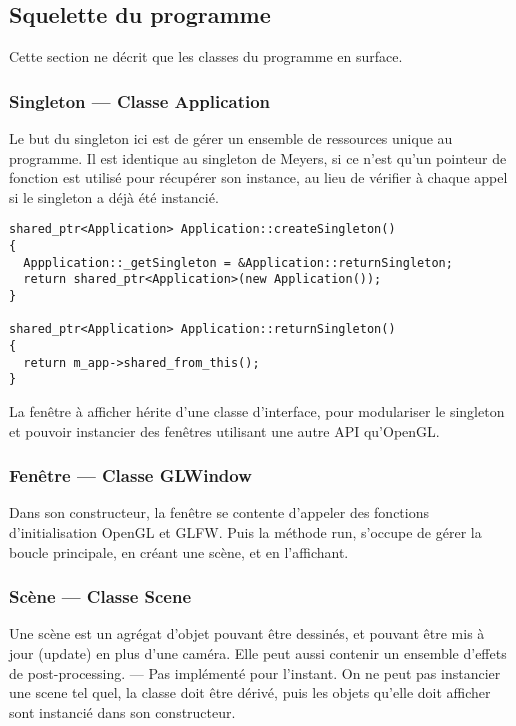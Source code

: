\documentclass[11pt, a4paper, titlepage]{article}
\begin{document}
\subsection{Squelette du programme}

Cette section ne décrit que les classes du programme en surface.

\subsubsection{Singleton --- Classe Application}

Le but du singleton ici est de gérer un ensemble de ressources unique au programme.
Il est identique au singleton de Meyers, si ce n'est qu'un pointeur de fonction est utilisé pour récupérer son instance, au lieu de vérifier à chaque appel
si le singleton a déjà été instancié.

\lstset{language=C++}

\begin{lstlisting}
shared_ptr<Application> Application::createSingleton()
{
  Appplication::_getSingleton = &Application::returnSingleton;
  return shared_ptr<Application>(new Application());
}

shared_ptr<Application> Application::returnSingleton()
{
  return m_app->shared_from_this();
}
\end{lstlisting}

La fenêtre à afficher hérite d'une classe d'interface, pour modulariser le singleton et pouvoir instancier des fenêtres utilisant une autre API qu'OpenGL.

\subsubsection{Fenêtre --- Classe GLWindow}

Dans son constructeur, la fenêtre se contente d'appeler des fonctions d'initialisation OpenGL et GLFW. Puis la méthode run, s'occupe de gérer la boucle
principale, en créant une scène, et en l'affichant.

\subsubsection{Scène --- Classe Scene}

Une scène est un agrégat d'objet pouvant être dessinés, et pouvant être mis à jour (update) en plus d'une caméra.
Elle peut aussi contenir un ensemble d'effets de post-processing. --- Pas implémenté pour l'instant. 
On ne peut pas instancier une scene tel quel, la classe doit être dérivé, puis les objets qu'elle doit afficher sont instancié dans son constructeur.
\end{document}
